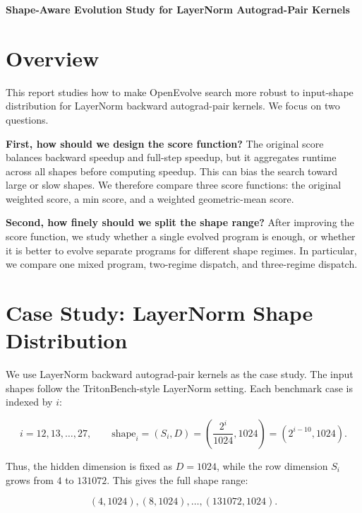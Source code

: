 \documentclass[11pt]{article}
\begin{document}
\begin{center}
    {\Large \textbf{Shape-Aware Evolution Study for LayerNorm Autograd-Pair Kernels}}
\end{center}

\vspace{1em}

\section{Overview}

\noindent
This report studies how to make OpenEvolve search more robust to input-shape distribution for LayerNorm backward autograd-pair kernels. We focus on two questions.

\vspace{0.5em}

\noindent
\textbf{First, how should we design the score function?}
The original score balances backward speedup and full-step speedup, but it aggregates runtime across all shapes before computing speedup. This can bias the search toward large or slow shapes. We therefore compare three score functions: the original weighted score, a min score, and a weighted geometric-mean score.

\vspace{0.5em}

\noindent
\textbf{Second, how finely should we split the shape range?}
After improving the score function, we study whether a single evolved program is enough, or whether it is better to evolve separate programs for different shape regimes. In particular, we compare one mixed program, two-regime dispatch, and three-regime dispatch.

\section{Case Study: LayerNorm Shape Distribution}

\noindent
We use LayerNorm backward autograd-pair kernels as the case study. The input shapes follow the TritonBench-style LayerNorm setting. Each benchmark case is indexed by \(i\):

\[
i = 12, 13, \ldots, 27,
\qquad
\mathrm{shape}_i
=
(S_i, D)
=
\left(\frac{2^i}{1024}, 1024\right)
=
(2^{i-10}, 1024).
\]

\noindent
Thus, the hidden dimension is fixed as \(D=1024\), while the row dimension \(S_i\) grows from \(4\) to \(131072\). This gives the full shape range:

\[
(4,1024), (8,1024), \ldots, (131072,1024).
\]
\end{document}
